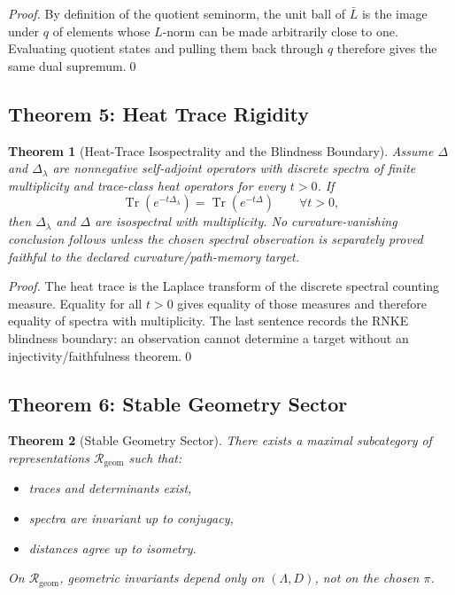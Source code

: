 \documentclass[12pt, oneside]{article}
\newtheorem{theorem}{Theorem}[section]
\DeclareMathOperator{\Tr}{Tr}
\begin{document}
\begin{proof}
By definition of the quotient seminorm, the unit ball of $\bar L$ is the image under $q$ of elements whose $L$-norm can be made arbitrarily close to one. Evaluating quotient states and pulling them back through $q$ therefore gives the same dual supremum.\qed
\end{proof}

\subsection{Theorem 5: Heat Trace Rigidity}

\begin{theorem}[Heat-Trace Isospectrality and the Blindness Boundary]
Assume $\Delta$ and $\Delta_\lambda$ are nonnegative self-adjoint operators with discrete spectra of finite multiplicity and trace-class heat operators for every $t>0$. If
\[
\Tr(e^{-t\Delta_\lambda})=\Tr(e^{-t\Delta})\qquad\forall t>0,
\]
then $\Delta_\lambda$ and $\Delta$ are isospectral with multiplicity. No curvature-vanishing conclusion follows unless the chosen spectral observation is separately proved faithful to the declared curvature/path-memory target.
\end{theorem}

\begin{proof}
The heat trace is the Laplace transform of the discrete spectral counting measure. Equality for all $t>0$ gives equality of those measures and therefore equality of spectra with multiplicity. The last sentence records the RNKE blindness boundary: an observation cannot determine a target without an injectivity/faithfulness theorem.\qed
\end{proof}

\subsection{Theorem 6: Stable Geometry Sector}

\begin{theorem}[Stable Geometry Sector]
There exists a maximal subcategory of representations $\mathcal{R}_{\mathrm{geom}}$ such that:
\begin{itemize}
    \item traces and determinants exist,
    \item spectra are invariant up to conjugacy,
    \item distances agree up to isometry.
\end{itemize}
On $\mathcal{R}_{\mathrm{geom}}$, geometric invariants depend only on $(\Lambda, D)$, not on the chosen $\pi$.
\end{theorem}
\end{document}
